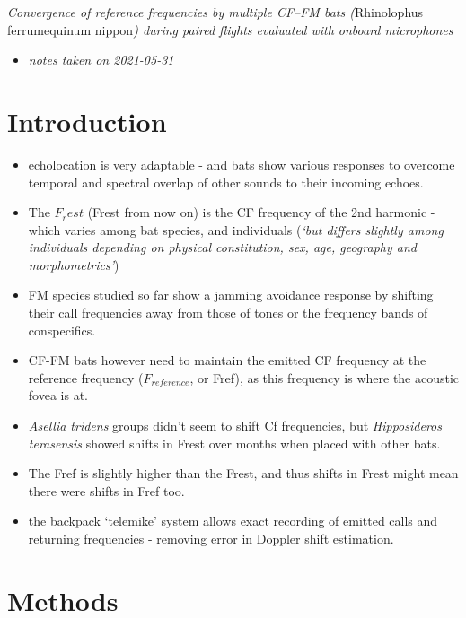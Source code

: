 \documentclass[
]{book}
\providecommand{\tightlist}{%
  \setlength{\itemsep}{0pt}\setlength{\parskip}{0pt}}
\begin{document}
\emph{Convergence of reference frequencies by multiple CF--FM bats (}Rhinolophus ferrumequinum nippon\emph{) during paired flights evaluated with onboard microphones} \citep{furusawa2012convergence}

\begin{itemize}
\tightlist
\item
  \emph{notes taken on 2021-05-31}
\end{itemize}

\hypertarget{introduction-15}{%
\section{Introduction}\label{introduction-15}}

\begin{itemize}
\tightlist
\item
  echolocation is very adaptable - and bats show various responses to overcome temporal and spectral overlap of
  other sounds to their incoming echoes.
\item
  The \(F_rest\) (Frest from now on) is the CF frequency of the 2nd harmonic - which varies among bat species, and individuals (\emph{`but differs slightly among individuals depending on physical constitution, sex, age, geography and morphometrics'})
\item
  FM species studied so far show a jamming avoidance response by shifting their call frequencies away from those of tones or the frequency bands of conspecifics.
\item
  CF-FM bats however need to maintain the emitted CF frequency at the reference frequency (\(F_{reference}\), or Fref), as this frequency is where the acoustic fovea is at.
\item
  \emph{Asellia tridens} groups didn't seem to shift Cf frequencies, but \emph{Hipposideros terasensis} showed shifts in Frest over months when placed with other bats.
\item
  The Fref is slightly higher than the Frest, and thus shifts in Frest might mean there were shifts in Fref too.
\item
  the backpack `telemike' system allows exact recording of emitted calls and returning frequencies - removing error in Doppler shift estimation.
\end{itemize}

\hypertarget{methods-13}{%
\section{Methods}\label{methods-13}}
\end{document}
